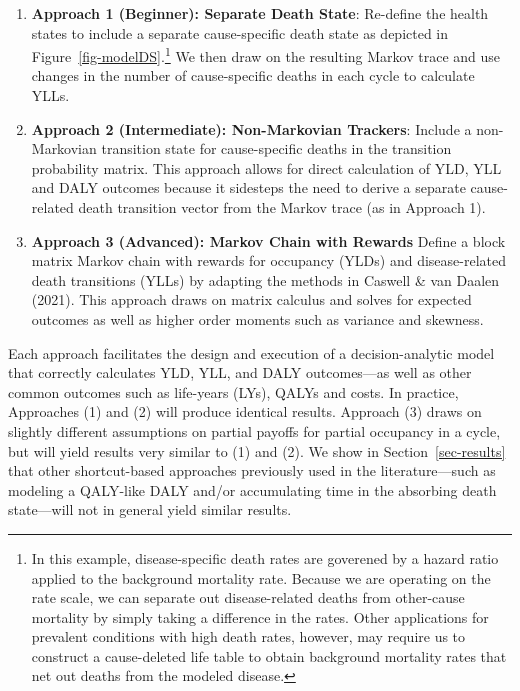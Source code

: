 \documentclass[
]{agujournal2019}
\begin{document}
\begin{enumerate}
\def\labelenumi{\arabic{enumi}.}
\item
  \textbf{Approach 1 (Beginner): Separate Death State}: Re-define the
  health states to include a separate cause-specific death state as
  depicted in Figure~\ref{fig-modelDS}.\footnote{In this example,
    disease-specific death rates are goverened by a hazard ratio applied
    to the background mortality rate. Because we are operating on the
    rate scale, we can separate out disease-related deaths from
    other-cause mortality by simply taking a difference in the rates.
    Other applications for prevalent conditions with high death rates,
    however, may require us to construct a cause-deleted life table to
    obtain background mortality rates that net out deaths from the
    modeled disease.} We then draw on the resulting Markov trace and use
  changes in the number of cause-specific deaths in each cycle to
  calculate YLLs.
\item
  \textbf{Approach 2 (Intermediate): Non-Markovian Trackers}: Include a
  non-Markovian transition state for cause-specific deaths in the
  transition probability matrix. This approach allows for direct
  calculation of YLD, YLL and DALY outcomes because it sidesteps the
  need to derive a separate cause-related death transition vector from
  the Markov trace (as in Approach 1).
\item
  \textbf{Approach 3 (Advanced): Markov Chain with Rewards} Define a
  block matrix Markov chain with rewards for occupancy (YLDs) and
  disease-related death transitions (YLLs) by adapting the methods in
  Caswell \& van Daalen (2021). This approach draws on matrix calculus
  and solves for expected outcomes as well as higher order moments such
  as variance and skewness.
\end{enumerate}

Each approach facilitates the design and execution of a
decision-analytic model that correctly calculates YLD, YLL, and DALY
outcomes---as well as other common outcomes such as life-years (LYs),
QALYs and costs. In practice, Approaches (1) and (2) will produce
identical results. Approach (3) draws on slightly different assumptions
on partial payoffs for partial occupancy in a cycle, but will yield
results very similar to (1) and (2). We show in
Section~\ref{sec-results} that other shortcut-based approaches
previously used in the literature---such as modeling a QALY-like DALY
and/or accumulating time in the absorbing death state---will not in
general yield similar results.
\end{document}
